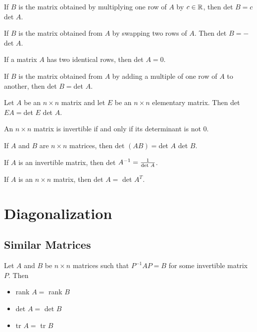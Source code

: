 \documentclass[english,12pt]{article}
\begin{document}
\begin{thrm}
If $B$ is the matrix obtained by multiplying one row of $A$ by $c \in {\mathbb{R}}$, then det $B = c$ det $A$.
\end{thrm}

\begin{thrm}
If $B$ is the matrix obtained from $A$ by swapping two rows of $A$. Then det $B = -$det $A$.
\end{thrm}

\begin{thrm}
If a matrix $A$ has two identical rows, then det $A = 0$.
\end{thrm}

\begin{thrm}
If $B$ is the matrix obtained from $A$ by adding a multiple of one row of $A$ to another, then det $B = $det $A$.
\end{thrm}

\begin{thrm}
Let $A$ be an $n \times n$ matrix and let $E$ be an $n \times n$ elementary matrix. Then det $EA = $det $E$ det $A$.
\end{thrm}

\begin{thrm}
An $n \times n$ matrix is invertible if and only if its determinant is not $0$.
\end{thrm}

\begin{thrm}
If $A$ and $B$ are $n \times n$ matrices, then det $(AB) = $det $A$ det $B$.
\end{thrm}

\begin{thrm}
If $A$ is an invertible matrix, then det $A^{-1} = \frac{1}{\text{det }A}$.
\end{thrm}

\begin{thrm}
If $A$ is an $n \times n$ matrix, then det $A = $ det $A^T$.
\end{thrm}

\section{Diagonalization}

\subsection{Similar Matrices}

\begin{thrm}
Let $A$ and $B$ be $n \times n$ matrices such that $P^{-1}AP = B$ for some invertible matrix $P$. Then
\begin{itemize}
\item rank $A = $ rank $B$
\item det $A = $ det $B$
\item tr $A = $ tr $B$
\end{itemize}
\end{thrm}
\end{document}
